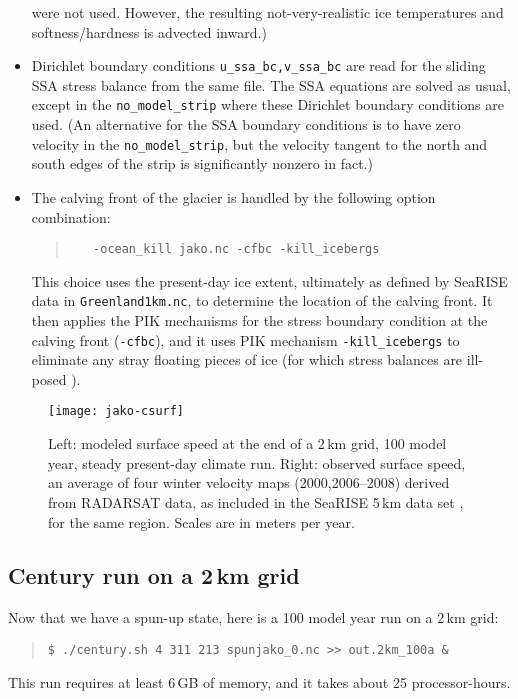 \begin{itemize}
\begin{quote}
\normalsize\end{quote}
were not used.  However, the resulting not-very-realistic ice temperatures and softness/hardness is advected inward.)
\item Dirichlet boundary conditions \verb|u_ssa_bc,v_ssa_bc| are read for the sliding SSA stress balance from the same file.  The SSA equations are solved as usual, except in the \verb|no_model_strip| where these Dirichlet boundary conditions are used.  (An alternative for the SSA boundary conditions is to have zero velocity in the \verb|no_model_strip|, but the velocity tangent to the north and south edges of the strip is significantly nonzero in fact.)
\item The calving front of the glacier is handled by the following option combination:
\begin{quote}\small
\begin{verbatim}
   -ocean_kill jako.nc -cfbc -kill_icebergs
\end{verbatim}
\normalsize\end{quote}
This choice uses the present-day ice extent, ultimately as defined by SeaRISE data in \verb|Greenland1km.nc|, to determine the location of the calving front.  It then applies the PIK mechanisms for the stress boundary condition at the calving front (\verb|-cfbc|), and it uses PIK mechanism \verb|-kill_icebergs| to eliminate any stray floating pieces of ice (for which stress balances are ill-posed \cite{Winkelmannetal2011}).
\end{itemize}


\begin{figure}[ht]
  \centering
  \texttt{[image: jako-csurf]}
  \caption{Left: modeled surface speed at the end of a 2\,km grid, 100 model year, steady present-day climate run.  Right: observed surface speed, an average of four winter velocity maps (2000,2006--2008) derived from RADARSAT data, as included in the SeaRISE  5\,km data set \cite{Joughinetal2010}, for the same region.  Scales are in meters per year.}
  \label{fig:jako-csurf}
\end{figure}


\subsection*{Century run on a 2\,km grid}
Now that we have a spun-up state, here is a 100 model year run on a 2\,km grid:
\begin{quote}\small
\begin{verbatim}
$ ./century.sh 4 311 213 spunjako_0.nc >> out.2km_100a &
\end{verbatim}
\normalsize\end{quote}
This run requires at least 6\,GB of memory, and it takes about 25 processor-hours.

